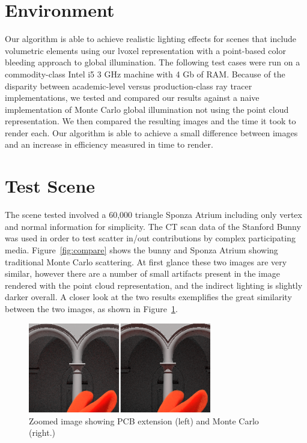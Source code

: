 \documentclass[12pt]{ucthesis}
\begin{document}
\section{Environment}

Our algorithm is able to achieve realistic lighting effects for scenes that include volumetric elements using our lvoxel representation with a point-based color bleeding approach to global illumination.
The following test cases were run on a commodity-class Intel i5 3 GHz machine with 4 Gb of RAM.  Because of the disparity between academic-level versus production-class ray tracer implementations, we tested and compared our results against a naive implementation of Monte Carlo global illumination not using the point cloud representation.  We then compared the resulting images and the time it took to render each.  Our algorithm is able to achieve a small difference between images and an increase in efficiency measured in time to render.

\section{Test Scene}

The scene tested involved a 60,000 triangle Sponza Atrium including only vertex and normal information for simplicity.  The CT scan data of the Stanford Bunny was used in order to test scatter in/out contributions by complex participating media.
Figure~\ref{fig:compare} shows the bunny and Sponza Atrium showing traditional Monte Carlo scattering.  At first glance these two images are very similar, however there are a number of small artifacts present in the image rendered with the point cloud representation, and the indirect lighting is slightly darker overall.  A closer look at the two results exemplifies the great similarity between the two images, as shown in Figure~\ref{fig:compare_close}.

\begin{figure}[h!]
    \centering
    \includegraphics[width=80mm]{img/compare1_corrected.png}
    \caption{Zoomed image showing PCB extension (left) and Monte Carlo (right.)}
    \label{fig:compare_close}
\end{figure}
\end{document}
